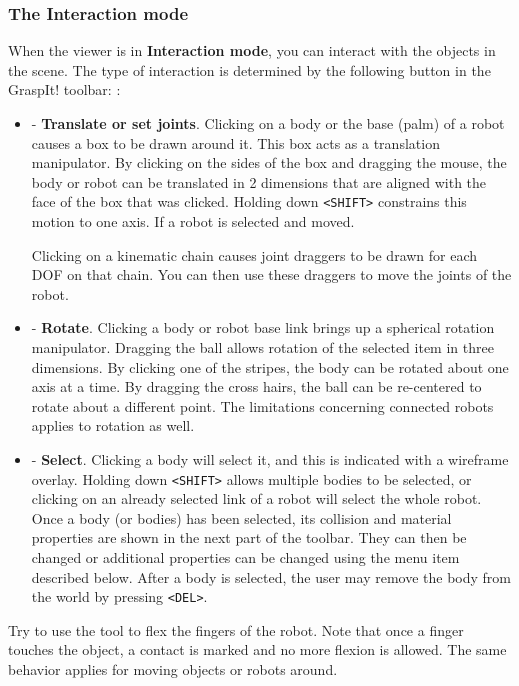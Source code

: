 \subsubsection{The Interaction mode}

When the viewer is in \textbf{Interaction mode}, you can interact with
the objects in the scene. The type of interaction is determined by the
following button in the GraspIt! toolbar: 
 :

\begin{itemize}
\item {} - \textbf{Translate or set
  joints}. Clicking on a body or the base (palm) of a robot causes a
  box to be drawn around it. This box acts as a translation
  manipulator. By clicking on the sides of the box and dragging the
  mouse, the body or robot can be translated in 2 dimensions that are
  aligned with the face of the box that was clicked. Holding down
  \texttt{<SHIFT>} constrains this motion to one axis. If a robot is
  selected and moved.

  Clicking on a kinematic chain causes joint draggers to be drawn for
  each DOF on that chain. You can then use these draggers to move the
  joints of the robot.
\item {} - \textbf{Rotate}. Clicking a body or
  robot base link brings up a spherical rotation manipulator. Dragging
  the ball allows rotation of the selected item in three
  dimensions. By clicking one of the stripes, the body can be rotated
  about one axis at a time. By dragging the cross hairs, the ball can
  be re-centered to rotate about a different point. The limitations
  concerning connected robots applies to rotation as well.
\item {} - \textbf{Select}. Clicking a body will
  select it, and this is indicated with a wireframe overlay. Holding
  down \texttt{<SHIFT>} allows multiple bodies to be selected, or
  clicking on an already selected link of a robot will select the
  whole robot. Once a body (or bodies) has been selected, its
  collision and material properties are shown in the next part of the
  toolbar. They can then be changed or additional properties can be
  changed using the menu item described below. After a body is
  selected, the user may remove the body from the world by pressing
  \texttt{<DEL>}.
\end{itemize}

Try to use the  tool to flex the fingers of
the robot. Note that once a finger touches the object, a contact is
marked and no more flexion is allowed. The same behavior applies for
moving objects or robots around.

